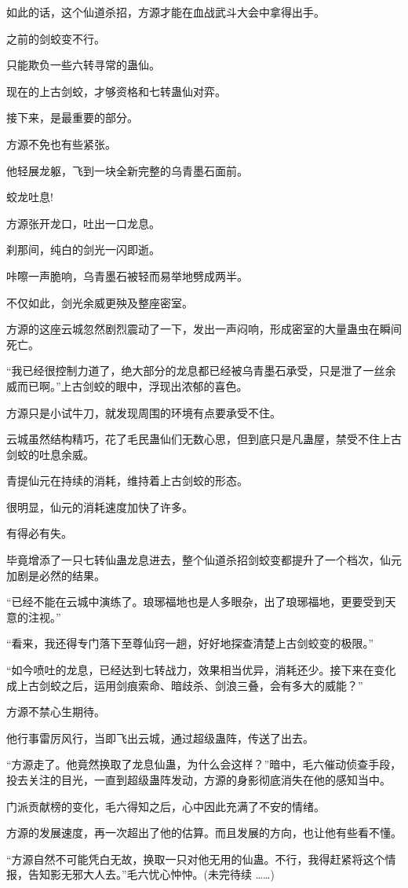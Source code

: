 \begin{this_body}
如此的话，这个仙道杀招，方源才能在血战武斗大会中拿得出手。

之前的剑蛟变不行。

只能欺负一些六转寻常的蛊仙。

现在的上古剑蛟，才够资格和七转蛊仙对弈。

接下来，是最重要的部分。

方源不免也有些紧张。

他轻展龙躯，飞到一块全新完整的乌青墨石面前。

蛟龙吐息!

方源张开龙口，吐出一口龙息。

刹那间，纯白的剑光一闪即逝。

咔嚓一声脆响，乌青墨石被轻而易举地劈成两半。

不仅如此，剑光余威更殃及整座密室。

方源的这座云城忽然剧烈震动了一下，发出一声闷响，形成密室的大量蛊虫在瞬间死亡。

“我已经很控制力道了，绝大部分的龙息都已经被乌青墨石承受，只是泄了一丝余威而已啊。”上古剑蛟的眼中，浮现出浓郁的喜色。

方源只是小试牛刀，就发现周围的环境有点要承受不住。

云城虽然结构精巧，花了毛民蛊仙们无数心思，但到底只是凡蛊屋，禁受不住上古剑蛟的吐息余威。

青提仙元在持续的消耗，维持着上古剑蛟的形态。

很明显，仙元的消耗速度加快了许多。

有得必有失。

毕竟增添了一只七转仙蛊龙息进去，整个仙道杀招剑蛟变都提升了一个档次，仙元加剧是必然的结果。

“已经不能在云城中演练了。琅琊福地也是人多眼杂，出了琅琊福地，更要受到天意的注视。”

“看来，我还得专门落下至尊仙窍一趟，好好地探查清楚上古剑蛟变的极限。”

“如今喷吐的龙息，已经达到七转战力，效果相当优异，消耗还少。接下来在变化成上古剑蛟之后，运用剑痕索命、暗歧杀、剑浪三叠，会有多大的威能？”

方源不禁心生期待。

他行事雷厉风行，当即飞出云城，通过超级蛊阵，传送了出去。

“方源走了。他竟然换取了龙息仙蛊，为什么会这样？”暗中，毛六催动侦查手段，投去关注的目光，一直到超级蛊阵发动，方源的身影彻底消失在他的感知当中。

门派贡献榜的变化，毛六得知之后，心中因此充满了不安的情绪。

方源的发展速度，再一次超出了他的估算。而且发展的方向，也让他有些看不懂。

“方源自然不可能凭白无故，换取一只对他无用的仙蛊。不行，我得赶紧将这个情报，告知影无邪大人去。”毛六忧心忡忡。(未完待续 ……)

\end{this_body}

